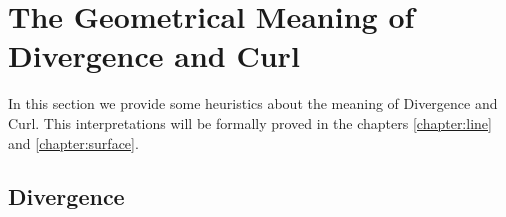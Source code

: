 % 


\section{The Geometrical Meaning of  Divergence and Curl}

In this section we provide some heuristics about the meaning of Divergence and Curl. This interpretations will be formally proved in 
the chapters \ref{chapter:line}  and \ref{chapter:surface}.

\subsection{Divergence}




